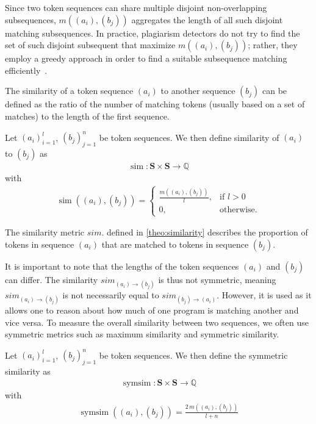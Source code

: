 Since two token sequences can share multiple disjoint non-overlapping subsequences, \(m((a_i), (b_j))\) aggregates the length of all such disjoint matching subsequences. In practice, plagiarism detectors do not try to find the set of such disjoint subsequent that maximize \(m((a_i), (b_j))\); rather, they employ a greedy approach in order to find a suitable subsequence matching efficiently~\cite{Wise1993}.

The similarity of a token sequence \((a_i)\) to another sequence \((b_j)\) can be defined as the ratio of the number of matching tokens (usually based on a set of matches) to the length of the first sequence.

\begin{theorem} \label{theo:similarity}
    Let \((a_i)_{i=1}^l\), \((b_j)_{j=1}^n\) be token sequences.
    We then define similarity of \((a_i)\) to \((b_j)\) as
    \begin{align*}
    \operatorname{sim} : \mathbf{S} \times \mathbf{S} \rightarrow \mathbb{Q}
    \end{align*}
    with
    \begin{align*}
        \operatorname{sim}((a_i), (b_j)) = 
        \begin{cases}
            \frac{m((a_i), (b_j))}{l}, & \text{if } l > 0\\
            0, & \text{otherwise} .
        \end{cases}
    \end{align*}
\end{theorem}

The similarity metric \(sim\). defined in \autoref{theo:similarity} describes the proportion of tokens in sequence \((a_i)\) that are matched to tokens in sequence \((b_j)\).

It is important to note that the lengths of the token sequences \((a_i)\) and \((b_j)\) can differ.
The similarity \( {sim}_{(a_i) \rightarrow (b_j)} \) is thus not symmetric, meaning \( {sim}_{(a_i) \rightarrow (b_j)} \) is not necessarily equal to \( {sim}_{(b_j) \rightarrow (a_i)} \). However, it is used as it allows one to reason about how much of one program is matching another and vice versa.
To measure the overall similarity between two sequences, we often use symmetric metrics such as maximum similarity and symmetric similarity.

\begin{theorem} \label{theo:avgsim}
    Let \((a_i)_{i=1}^l\), \((b_j)_{j=1}^n\) be token sequences.
    We then define the symmetric similarity as
    \begin{align*}
    \operatorname{symsim} : \mathbf{S} \times \mathbf{S} \rightarrow \mathbb{Q}
    \end{align*}
    with
    \begin{align*}
        \operatorname{symsim}((a_i), (b_j)) = \frac{2 \, m((a_i), (b_j))}{l+n}
    \end{align*}
\end{theorem}

